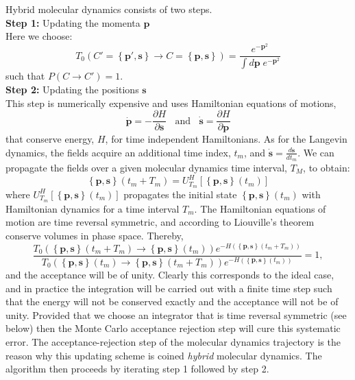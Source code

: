  Hybrid molecular dynamics  consists of two steps.  \\
{\bf Step 1:} Updating the momenta  $ \pmb{p} $ \\
 Here we  choose:
 \begin{equation}   
 	T_0 \left(C' =\left\{\pmb{p}',\pmb{s} \right\} \rightarrow C = \left\{\pmb{p},\pmb{s} \right\}  \right)   = \frac{e^{- \pmb{p}^2}} {\int d \pmb{p}  \; e^{ -\pmb{p}^2} }
\end{equation}
such that   $P(C \rightarrow C')  = 1$.  \\
{\bf Step 2:}  Updating the positions $ \pmb{s} $ \\  
This step is numerically expensive  and uses Hamiltonian equations of motions,  
\begin{equation}
  \dot{\pmb{p}}   = - \frac {\partial H}{\partial \pmb{s}} \; \;  \text{ and }  \; \;  \dot{\pmb{s}}   =  \frac {\partial H}{\partial \pmb{p}} 
\end{equation}
that  conserve energy, $H$, for time independent Hamiltonians.   As for the Langevin dynamics, the fields acquire an additional time index, $t_m$, and 
$\dot{\pmb{s}} = \frac{d \pmb{s}}{d t_m} $.   We can propagate the fields  over a given molecular dynamics time interval, $T_M$, to obtain: 
\begin{equation}
	\left\{ \pmb{p},  \pmb{s} \right\} (t_m  + T_m)   =  U^H_{T_m} \left[ \left\{ \pmb{p},  \pmb{s}  \right\} (t_m)\right]
\end{equation} 
where $U^H_{T_m}\left[ \left\{ \pmb{p},  \pmb{s}  \right\} (t_m)\right]$   propagates the initial state  $\left\{ \pmb{p},  \pmb{s}  \right\} (t_m)$ with Hamiltonian dynamics for a time  interval $T_m$. 
The  Hamiltonian equations of motion  are time  reversal symmetric, and  according to Liouville's  theorem conserve volumes  in phase space.  Thereby,
\begin{equation}
 \frac{T_0 \left(  \left\{ \pmb{p},  \pmb{s} \right\}  (t_m  + T_m)    \rightarrow   \left\{  \pmb{p},  \pmb{s} \right\} (t_m)  \right) e^{-H( \left\{ \pmb{p},  \pmb{s} \right\}  (t_m  + T_m) ) } }{
 T_0 \left(  \left\{ \pmb{p},  \pmb{s} \right\}  (t_m  )    \rightarrow   \left\{  \pmb{p},  \pmb{s} \right\} (t_m + T_m)  \right) e^{-H( \left\{ \pmb{p},  \pmb{s} \right\}  (t_m  ) ) }} = 1, 
\end{equation}
and the acceptance will be of unity.      Clearly this corresponds to the ideal case, and in practice the integration will be carried out with a finite time step such that the energy will not be conserved exactly and the acceptance  will not be of unity. 
Provided that we choose an integrator  that  is time reversal symmetric (see below) then the  Monte Carlo acceptance rejection step  will  cure this systematic error.   The acceptance-rejection step of the  molecular dynamics trajectory is the reason why this updating scheme is coined {\it hybrid} molecular dynamics.    
The algorithm  then proceeds by iterating   step 1 followed by step 2.

